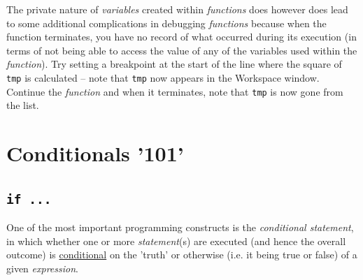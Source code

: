 \documentclass{tufte-book} %
\begin{document}
The private nature of \textit{variables} created within \textit{functions} does however does lead to some additional complications in debugging \textit{functions} because when the function terminates, you have no record of what occurred during its execution (in terms of not being able to access the value of any of the variables used within the \textit{function}). Try setting a breakpoint at the start of the line where the square of \texttt{tmp} is calculated -- note that \texttt{tmp} now appears in the \textsf{Workspace window}. Continue the \textit{function} and when it terminates, note that \texttt{tmp} is now gone from the list.


\newpage


\section{Conditionals '101'}


\subsection{\texttt{if ...}}

One of the most important programming constructs is the \textit{conditional statement}, in which whether one or more \textit{statement}(s) are executed (and hence the overall outcome) is \uline{conditional} on the 'truth' or otherwise (i.e. it being true or false) of a given \textit{expression}.
\end{document}
